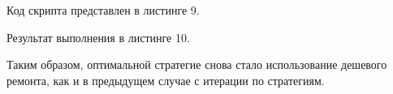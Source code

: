 Код скрипта представлен в листинге 9.



\newpage

Результат выполнения в листинге 10.



Таким образом, оптимальной стратегие снова стало использование дешевого ремонта, как и в предыдущем случае с итерации по стратегиям.